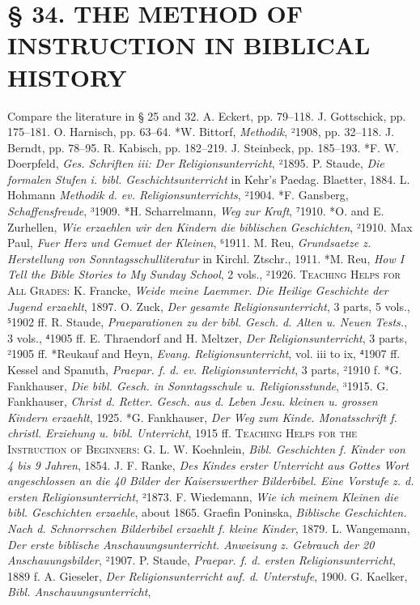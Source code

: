 \chapter[§ 34. THE METHOD IN BIBLICAL HISTORY]{§ 34. THE METHOD OF INSTRUCTION IN BIBLICAL HISTORY}

Compare the literature in § 25 and 32. A. Eckert, pp. 79–118. J. Gottschick, pp. 175–181. O. Harnisch, pp. 63–64. *W. Bittorf, \emph{Methodik}, ²1908, pp. 32–118. J. Berndt, pp. 78–95. R. Kabisch, pp. 182–219. J. Steinbeck, pp. 185–193. *F. W. Doerpfeld, \emph{Ges. Schriften iii: Der Religionsunterricht}, ²1895. P. Staude, \emph{Die formalen Stufen i. bibl. Geschichtsunterricht} in Kehr’s Paedag. Blaetter, 1884. L. Hohmann \emph{Methodik d. ev. Religionsunterrichts}, ²1904. *F. Gansberg, \emph{Schaffensfreude}, ³1909. *H. Scharrelmann, \emph{Weg zur Kraft}, ⁷1910. *O. and E. Zurhellen, \emph{Wie erzaehlen wir den Kindern die biblischen Geschichten}, ²1910. Max Paul, \emph{Fuer Herz und Gemuet der Kleinen}, ⁶1911. M. Reu, \emph{Grundsaetze z. Herstellung von Sonntagsschulliteratur} in Kirchl. Ztschr., 1911. *M. Reu, \emph{How I Tell the Bible Stories to My Sunday School}, 2 vols., ²1926. \textsc{Teaching Helps for All Grades:} K. Francke, \emph{Weide meine Laemmer. Die Heilige Geschichte der Jugend erzaehlt}, 1897. O. Zuck, \emph{Der gesamte Religionsunterricht}, 3 parts, 5 vols., ⁵1902 ff. R. Staude, \emph{Praeparationen zu der bibl. Gesch. d. Alten u. Neuen Tests.}, 3 vols., ⁴1905 ff. E. Thraendorf and H. Meltzer, \emph{Der Religionsunterricht}, 3 parts, ²1905 ff. *Reukauf and Heyn, \emph{Evang. Religionsunterricht}, vol. iii to ix, ⁴1907 ff. Kessel and Spanuth, \emph{Praepar. f. d. ev. Religionsunterricht}, 3 parts, ²1910 f. *G. Fankhauser, \emph{Die bibl. Gesch. in Sonntagsschule u. Religionsstunde}, ³1915. G. Fankhauser, \emph{Christ d. Retter. Gesch. aus d. Leben Jesu. kleinen u. grossen Kindern erzaehlt}, 1925. *G. Fankhauser, \emph{Der Weg zum Kinde. Monatsschrift f. christl. Erziehung u. bibl. Unterricht}, 1915 ff. \textsc{Teaching Helps for the Instruction of Beginners:} G. L. W. Koehnlein, \emph{Bibl. Geschichten f. Kinder von 4 bis 9 Jahren}, 1854. J. F. Ranke, \emph{Des Kindes erster Unterricht aus Gottes Wort angeschlossen an die 40 Bilder der Kaiserswerther Bilderbibel. Eine Vorstufe z. d. ersten Religionsunterricht}, ²1873. F. Wiedemann, \emph{Wie ich meinem Kleinen die bibl. Geschichten erzaehle}, about 1865. Graefin Poninska, \emph{Biblische Geschichten. Nach d. Schnorrschen Bilderbibel erzaehlt f. kleine Kinder}, 1879. L. Wangemann, \emph{Der erste biblische Anschauungsunterricht. Anweisung z. Gebrauch der 20 Anschauungsbilder}, ²1907. P. Staude, \emph{Praepar. f. d. ersten Religionsunterricht}, 1889 f. A. Gieseler, \emph{Der Religionsunterricht auf. d. Unterstufe}, 1900. G. Kaelker, \emph{Bibl. Anschauungsunterricht},
